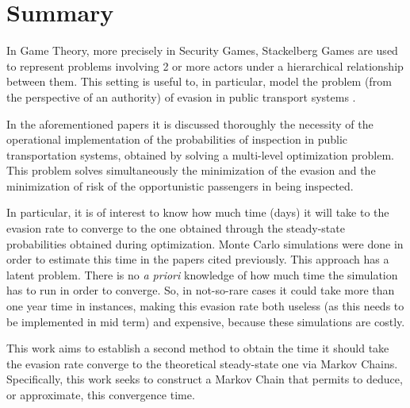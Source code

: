 \documentclass[10pt,letterpaper]{article}
\begin{document}
\section*{Summary}
In Game Theory, more precisely in Security Games, Stackelberg Games are used to represent problems involving 2 or more actors under a hierarchical relationship between them. This setting is useful to, in particular, model the problem (from the perspective of an authority) of evasion in public transport systems \citep{FareInspection} \citep{BROTCORNE20211}.\par
In the aforementioned papers it is discussed thoroughly the necessity of the operational implementation of the probabilities of inspection in public transportation systems, obtained by solving a multi-level optimization problem. This problem solves simultaneously the minimization of the evasion and the minimization of risk of the opportunistic passengers in being inspected.\par
In particular, it is of interest to know how much time (days) it will take to the evasion rate to converge to the one obtained through the steady-state probabilities obtained during optimization. Monte Carlo simulations were done in order to estimate this time in the papers cited previously. This approach has a latent problem. There is no \textit{a priori} knowledge of how much time the simulation has to run in order to converge. So, in not-so-rare cases it could take more than one year time in instances, making this evasion rate both useless (as this needs to be implemented in mid term) and expensive, because these simulations are costly.\par
This work aims to establish a second method to obtain the time it should take the evasion rate converge to the theoretical steady-state one via Markov Chains. Specifically, this work seeks to construct a Markov Chain that permits to deduce, or approximate, this convergence time.\par
\end{document}
